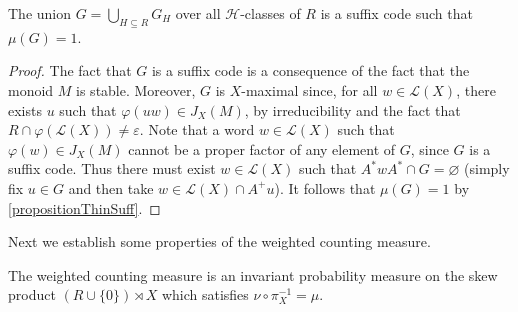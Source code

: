 \documentclass[a4paper,UKenglish,numberwithinsect,cleveref]{lipics-v2021}
\newcommand{\HH}{\mathrel{\mathscr{H}}}
\newcommand{\cL}{\mathcal L}
\begin{document}
\begin{lemma}\label{lemmaGr}
    The union $G = \bigcup_{H\subseteq R}G_H$ over all $\HH$-classes of $R$ is a suffix code such that $\mu(G)=1$.
\end{lemma}

\begin{proof}
    The fact that $G$ is a suffix code is a consequence of the fact that the monoid $M$ is stable. Moreover, $G$ is $X$-maximal since, for all $w\in\cL(X)$, there exists $u$ such that $\varphi(uw)\in J_X(M)$, by irreducibility and the fact that $R\cap\varphi(\cL(X))\neq\varepsilon$. Note that a word $w\in \cL(X)$ such that $\varphi(w)\in J_X(M)$ cannot be a  proper factor of any element of $G$, since $G$ is a suffix code. Thus there must exist $w\in\cL(X)$ such that $A^*wA^*\cap G = \varnothing$ (simply fix $u\in G$ and then take $w\in \cL(X)\cap A^+u$). It follows that $\mu(G)=1$ by \cref{propositionThinSuff}.
\end{proof}

Next we establish some properties of the weighted counting measure.

\begin{proposition}\label{p:weighted-counting}
    The weighted counting measure is an invariant probability measure on the skew product $(R\cup\{0\})\rtimes X$ which satisfies $\nu\circ\pi_X^{-1} = \mu$.
\end{proposition}
\end{document}
